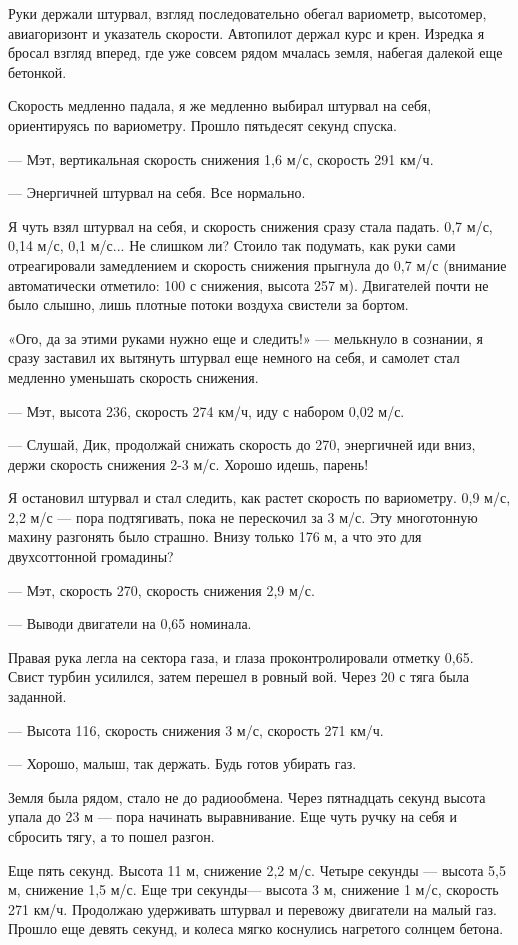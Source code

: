 \documentclass[11pt,a4paper,oneside]{article}
\begin{document}
Руки держали штурвал, взгляд последовательно обегал вариометр, высотомер, авиагоризонт и указатель скорости. Автопилот держал курс и крен. Изредка я бросал взгляд вперед, где уже совсем рядом мчалась земля, набегая далекой еще бетонкой.

Скорость медленно падала, я же медленно выбирал штурвал на себя, ориентируясь по вариометру. Прошло пятьдесят секунд спуска.

— Мэт, вертикальная скорость снижения 1,6 м/с, скорость 291 км/ч.

— Энергичней штурвал на себя. Все нормально.

Я чуть взял штурвал на себя, и скорость снижения сразу стала падать. 0,7 м/с, 0,14 м/с, 0,1 м/с... Не слишком ли? Стоило так подумать, как руки сами отреагировали замедлением и скорость снижения прыгнула до 0,7 м/с (внимание автоматически отметило: 100 с снижения, высота 257 м). Двигателей почти не было слышно, лишь плотные потоки воздуха свистели за бортом.

«Ого, да за этими руками нужно еще и следить!» — мелькнуло в сознании, я сразу заставил их вытянуть штурвал еще немного на себя, и самолет стал медленно уменьшать скорость снижения.

— Мэт, высота 236, скорость 274 км/ч, иду с набором 0,02 м/с.

— Слушай, Дик, продолжай снижать скорость до 270, энергичней иди вниз, держи скорость снижения 2-3 м/с. Хорошо идешь, парень!

Я остановил штурвал и стал следить, как растет скорость по вариометру. 0,9 м/с, 2,2 м/с — пора подтягивать, пока не перескочил за 3 м/с. Эту многотонную махину разгонять было страшно. Внизу только 176 м, а что это для двухсоттонной громадины?

— Мэт, скорость 270, скорость снижения 2,9 м/с.

— Выводи двигатели на 0,65 номинала.

Правая рука легла на сектора газа, и глаза проконтролировали отметку 0,65. Свист турбин усилился, затем перешел в ровный вой. Через 20 с тяга была заданной.

— Высота 116, скорость снижения 3 м/с, скорость 271 км/ч.

— Хорошо, малыш, так держать. Будь готов убирать газ.

Земля была рядом, стало не до радиообмена. Через пятнадцать секунд высота упала до 23 м — пора начинать выравнивание. Еще чуть ручку на себя и сбросить тягу, а то пошел разгон.

Еще пять секунд. Высота 11 м, снижение 2,2 м/с. Четыре секунды — высота 5,5 м, снижение 1,5 м/с. Еще три секунды— высота 3 м, снижение 1 м/с, скорость 271 км/ч. Продолжаю удерживать штурвал и перевожу двигатели на малый газ. Прошло еще девять секунд, и колеса мягко коснулись нагретого солнцем бетона.
\end{document}

